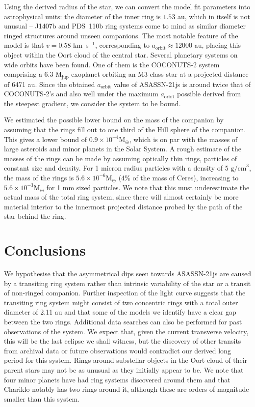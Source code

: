 \documentclass[letter]{aa} %
\newcommand{\kms}{km~s$^{-1}$}
\begin{document}
Using the derived radius of the star, we can convert the model fit parameters into astrophysical units: the diameter of the inner ring is $1.53$ au, which in itself is not unusual -- J1407b and PDS~110b ring systems come to mind as similar diameter ringed structures around unseen companions.
%
The most notable feature of the model is that $v = 0.58$ \kms, corresponding to $a_{\mathrm{orbit}} \approx 12000$ au, placing this object within the Oort cloud of the central star.
%
Several planetary systems on wide orbits have been found. One of them is the COCONUTS-2 system \citep{2021ApJ...916L..11Z} comprising a $6.3\, \,{\mathrm{M_{jup}}}$ exoplanet orbiting an M3 class star at a projected distance of 6471 au. 
%
Since the obtained $a_{\mathrm{orbit}}$ value of ASASSN-21js is around twice that of COCONUTS-2's and also well under the maximum $a_{\mathrm{orbit}}$ possible derived from the steepest gradient, we consider the system to be bound.

We estimated the possible lower bound on the mass of the  companion by assuming that the rings fill out to one third of the Hill sphere of the companion. 
%
This gives a lower bound of $0.9\times 10^{-4} \mathrm{M_\oplus}$, which is on par with the masses of large asteroids and minor planets in the Solar System. 
%
A rough estimate of the masses of the rings can be made by assuming optically thin rings, particles of constant size and density.
%
For 1 micron radius particles with a density of 5 $\mathrm{g/cm}^3$, the mass of the rings is $5.6\times 10^{-6} \mathrm{M_\oplus}$ (4\% of the mass of Ceres), increasing to $5.6\times 10^{-3} \mathrm{M_\oplus}$ for 1 mm sized particles.
%
We note that this must underestimate the actual mass of the total ring system, since there will almost certainly be more material interior to the innermost projected distance probed by the path of the star behind the ring.
%
\section{Conclusions}

We hypothesise that the asymmetrical dips seen towards ASASSN-21js are caused by a transiting ring system rather than intrinsic variability of the star or a transit of non-ringed companion.
%
Further inspection of the light curve suggests that the transiting ring system might consist of two concentric rings with a total outer diameter of 2.11 au and that some of the models we identify have a clear gap between the two rings.
%
Additional data searches can also be performed for past observations of the system. 
%
We expect that, given the current transverse velocity, this will be the last eclipse we shall witness, but the discovery of other transits from archival data or future observations would contradict our derived long period for this system.
%
Rings around substellar objects in the Oort cloud of their parent stars may not be as unusual as they initially appear to be.
%
We note that four minor planets have had ring systems discovered around them and that Chariklo \citep{2014Natur.508...72B} notably has two rings around it, although these are orders of magnitude smaller than this system.
\end{document}
